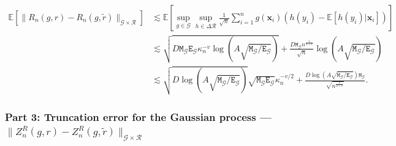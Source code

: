 \documentclass[10pt]{article}
\newcommand{\E}{\mathbb{E}}
\newcommand{\bx}{\mathbf{x}}
\newcommand{\G}{\mathcal{G}}
\newcommand{\R}{\mathcal{R}}
\newcommand{\ttE}{\mathtt{E}}
\newcommand{\ttM}{\mathtt{M}}
\begin{document}
\begin{align*}
    \E \left[\lVert R_n(g, r) - R_n(g,\widetilde{r})\rVert_{\G \times \R}\right] &
    \lesssim \E \left[\sup_{g \in \G} \sup_{h \in \Delta \R} \frac{1}{\sqrt{n}} \sum_{i = 1}^n g(\bx_i)(h(y_i) - \E[h(y_i)|\bx_i])\right]\\
    & \lesssim \sqrt{D \ttM_{\G} \ttE_{\G}\kappa_n^{-v} \log (A \sqrt{\ttM_{\G}/\ttE_{\G}})} + \frac{D \ttM_{\G} n^{\frac{1}{2+v}}}{\sqrt{n}} \log (A \sqrt{\ttM_{\G}/\ttE_{\G}})\\
    & \lesssim \sqrt{D \log (A \sqrt{\ttM_{\G}/\ttE_{\G}})} \sqrt{\ttM_{\G} \ttE_{\G}} \kappa_n^{-v/2} + \frac{D \log (A \sqrt{\ttM_{\G}/\ttE_{\G}}) \ttM_{\G}}{\sqrt{n^{\frac{v}{2+v}}}}.
\end{align*}

\subsubsection*{Part 3: Truncation error for the Gaussian process --- $\lVert Z_n^R(g,r) - Z_n^R(g,\tilde{r}) \rVert_{\G \times \R}$}
\end{document}
